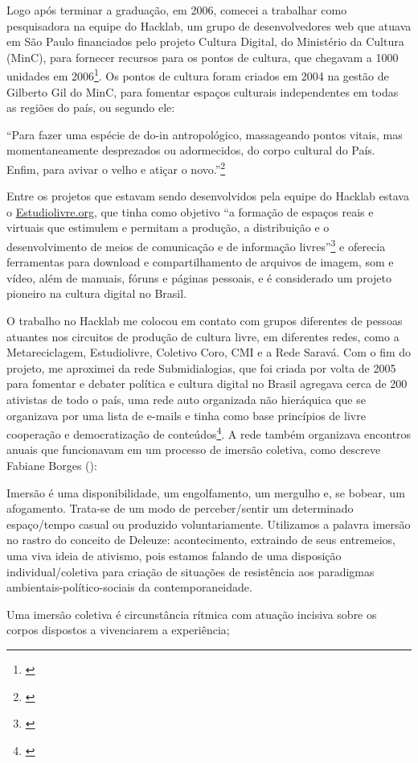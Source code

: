 Logo após terminar a graduação, em 2006, comecei a trabalhar como pesquisadora na equipe do Hacklab, um grupo de desenvolvedores web que atuava em São Paulo financiados pelo projeto Cultura Digital, do Ministério da Cultura (MinC), para fornecer recursos para os pontos de cultura, que chegavam a 1000 unidades em 2006\footnote{\cite[6]{Lima2009}}. Os pontos de cultura foram criados em 2004 na gestão de Gilberto Gil do MinC, para fomentar espaços culturais independentes em todas as regiões do país, ou segundo ele:
\begin{citacao}

``Para fazer uma espécie de do-in antropológico, massageando pontos vitais, mas momentaneamente desprezados ou adormecidos, do corpo cultural do País. Enfim, para avivar o velho e atiçar o novo.''\footnote{\cite{GilbertoGil2003}} 
\end{citacao}

Entre os projetos que estavam sendo desenvolvidos pela equipe do Hacklab estava o \url{Estudiolivre.org}, que tinha como objetivo ``a formação de espaços reais e virtuais que estimulem e permitam a produção, a distribuição e o desenvolvimento de meios de comunicação e de informação livres''\footnote{\cite[12]{Lima2009}} e oferecia ferramentas para download e compartilhamento de arquivos de imagem, som e vídeo, além de manuais, fóruns e páginas pessoais, e é considerado um projeto pioneiro na cultura digital no Brasil.  


O trabalho no Hacklab me colocou em contato com grupos diferentes de pessoas atuantes nos circuitos de produção de cultura livre, em diferentes redes, como a Metareciclagem, Estudiolivre, Coletivo Coro, CMI e a Rede Saravá. Com o fim do projeto, me aproximei da rede Submidialogias, que foi criada por volta de 2005 para fomentar e debater política e cultura digital no Brasil agregava cerca de 200 ativistas de todo o país, uma rede auto organizada não hieráquica que se organizava por uma lista de e-mails e tinha como base princípios de livre cooperação e democratização de conteúdos\footnote{\cite{Brunet}}. A rede também organizava encontros anuais que funcionavam em um processo de imersão coletiva, como descreve Fabiane Borges (\citeyear{FabianeMoraesBorges2010}):

\begin{citacao}
Imersão é uma disponibilidade, um engolfamento, um mergulho e, se bobear, um afogamento. Trata-se de um modo de perceber/sentir um determinado espaço/tempo casual ou produzido voluntariamente. Utilizamos a palavra imersão no rastro do conceito de Deleuze: acontecimento, extraindo de seus entremeios, uma viva ideia de ativismo, pois estamos falando de uma disposição individual/coletiva para criação de situações de resistência aos paradigmas ambientais-político-sociais da contemporaneidade.

Uma imersão coletiva é circunstância rítmica com atuação incisiva sobre os corpos dispostos a vivenciarem a experiência;
\end{citacao}
 
